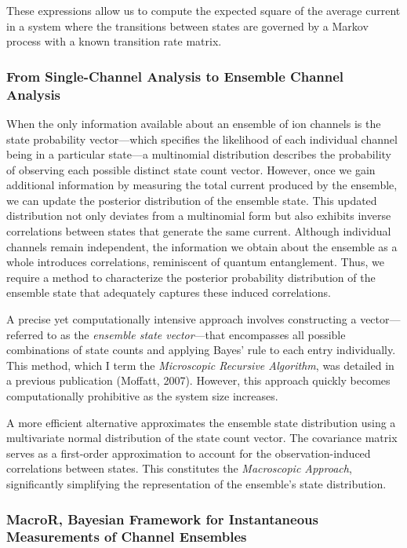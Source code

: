 \documentclass[pdflatex,sn-mathphys-num]{sn-jnl}%
\theoremstyle{thmstyleone}%
\theoremstyle{thmstyletwo}%
\theoremstyle{thmstylethree}%
\begin{document}
These expressions allow us to compute the expected square of the average current in a system where the transitions between states are governed by a Markov process with a known transition rate matrix.






\subsubsection{From Single-Channel Analysis to Ensemble Channel Analysis}

When the only information available about an ensemble of ion channels is the state probability vector—which specifies the likelihood of each individual channel being in a particular state—a multinomial distribution describes the probability of observing each possible distinct state count vector. However, once we gain additional information by measuring the total current produced by the ensemble, we can update the posterior distribution of the ensemble state. This updated distribution not only deviates from a multinomial form but also exhibits inverse correlations between states that generate the same current. Although individual channels remain independent, the information we obtain about the ensemble as a whole introduces correlations, reminiscent of quantum entanglement. Thus, we require a method to characterize the posterior probability distribution of the ensemble state that adequately captures these induced correlations.

A precise yet computationally intensive approach involves constructing a vector—referred to as the \textit{ensemble state vector}—that encompasses all possible combinations of state counts and applying Bayes' rule to each entry individually. This method, which I term the \textit{Microscopic Recursive Algorithm}, was detailed in a previous publication (Moffatt, 2007). However, this approach quickly becomes computationally prohibitive as the system size increases.

A more efficient alternative approximates the ensemble state distribution using a multivariate normal distribution of the state count vector. The covariance matrix serves as a first-order approximation to account for the observation-induced correlations between states. This constitutes the \textit{Macroscopic Approach}, significantly simplifying the representation of the ensemble's state distribution.

\subsubsection{MacroR, Bayesian Framework for Instantaneous Measurements of Channel Ensembles}
\end{document}
